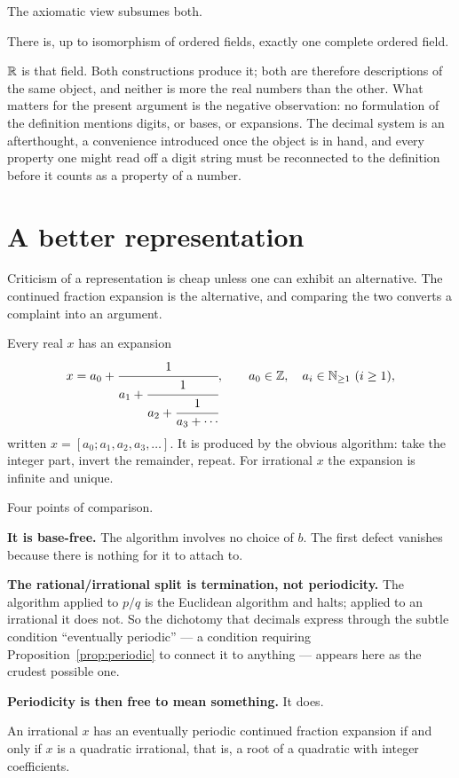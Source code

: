 \documentclass{essay}
\begin{document}
The axiomatic view subsumes both.

\begin{theorem}
There is, up to isomorphism of ordered fields, exactly one complete ordered
field.
\end{theorem}

$\mathbb{R}$ is that field. Both constructions produce it; both are therefore
descriptions of the same object, and neither is more the real numbers than the
other. What matters for the present argument is the negative observation: no
formulation of the definition mentions digits, or bases, or expansions. The
decimal system is an afterthought, a convenience introduced once the object is
in hand, and every property one might read off a digit string must be
reconnected to the definition before it counts as a property of a number.

\section{A better representation}

Criticism of a representation is cheap unless one can exhibit an alternative.
The continued fraction expansion is the alternative, and comparing the two
converts a complaint into an argument.

Every real $x$ has an expansion
\[
  x = a_0 + \cfrac{1}{a_1 + \cfrac{1}{a_2 + \cfrac{1}{a_3 + \dotsb}}},
  \qquad a_0 \in \mathbb{Z}, \quad a_i \in \mathbb{N}_{\ge 1} \ (i \ge 1),
\]
written $x = [a_0; a_1, a_2, a_3, \ldots]$. It is produced by the obvious
algorithm: take the integer part, invert the remainder, repeat. For irrational
$x$ the expansion is infinite and unique.

Four points of comparison.

\medskip
\noindent\textbf{It is base-free.} The algorithm involves no choice of $b$. The
first defect vanishes because there is nothing for it to attach to.

\medskip
\noindent\textbf{The rational/irrational split is termination, not
periodicity.} The algorithm applied to $p/q$ is the Euclidean algorithm and
halts; applied to an irrational it does not. So the dichotomy that decimals
express through the subtle condition ``eventually periodic'' --- a condition
requiring Proposition~\ref{prop:periodic} to connect it to anything --- appears
here as the crudest possible one.

\medskip
\noindent\textbf{Periodicity is then free to mean something.} It does.

\begin{theorem}[Lagrange]
An irrational $x$ has an eventually periodic continued fraction expansion if
and only if $x$ is a quadratic irrational, that is, a root of a quadratic with
integer coefficients.
\end{theorem}
\end{document}
